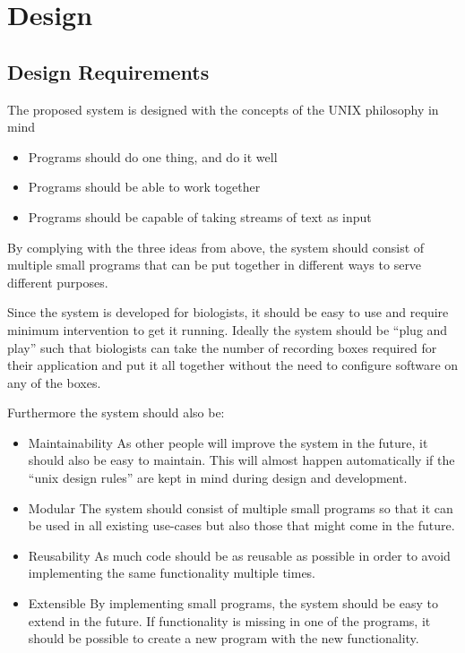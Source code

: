 \chapter{Design} \label{chp:design}
\section{Design Requirements}
The proposed system is designed with the concepts of the UNIX philosophy in mind
\begin{itemize}
	\item Programs should do one thing, and do it well
	\item Programs should be able to work together
	\item Programs should be capable of taking streams of text as input
\end{itemize}


By complying with the three ideas from above, the system should consist of multiple small programs that can be put together in different ways to serve different purposes.

Since the system is developed for biologists, it should be easy to use and require minimum intervention to get it running. Ideally the system should be “plug and play” such that biologists can take the number of recording boxes required for their application and put it all together without the need to configure software on any of the boxes. 


Furthermore the system should also be:

\begin{itemize}
	\item Maintainability
As other people will improve the system in the future, it should also be easy to maintain. This will almost happen automatically if the “unix design rules” are kept in mind during design and development.
\item Modular
The system should consist of multiple small programs so that it can be used in all existing use-cases but also those that might come in the future.
\item Reusability
As much code should be as reusable as possible in order to avoid implementing the same functionality multiple times.
\item Extensible
    By implementing small programs, the system should be easy to extend in the future.
    If functionality is missing in one of the programs, it should be possible to create a new 
    program with the new functionality.
\end{itemize}

